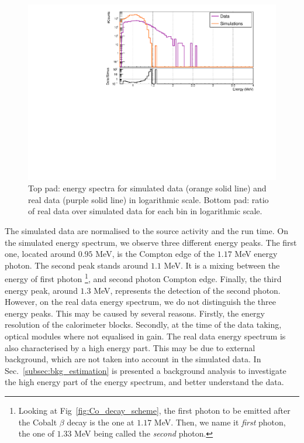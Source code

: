 \begin{figure}[h]
  \centering
  \includegraphics[width=17cm]{commissioning/fig_commissioning/Co_efficiency_detector.pdf}
  \caption{Top pad: energy spectra for simulated data (orange solid line) and real data (purple solid line) in logarithmic scale.
    Bottom pad: ratio of real data over simulated data for each bin in logarithmic scale.
\label{fig:detector_efficiency}}
\end{figure}
The simulated data are normalised to the source activity and the run time.
On the simulated energy spectrum, we observe three different energy peaks.
The first one, located around $0.95$ MeV, is the Compton edge of the $1.17$ MeV energy photon.
The second peak stands around $1.1$ MeV. It is a mixing between the energy of first photon
\footnote{Looking at Fig~\ref{fig:Co_decay_scheme}, the first photon to be emitted after the Cobalt $\beta$ decay is the one at $1.17$ MeV.
  Then, we name it \emph{first} photon, the one of $1.33$ MeV being called the \emph{second} photon.}, and second photon Compton edge.
Finally, the third energy peak, around $1.3$ MeV, represents the detection of the second photon.
However, on the real data energy spectrum, we do not distinguish the three energy peaks.
This may be caused by several reasons.
Firstly, the energy resolution of the calorimeter blocks.
Secondly, at the time of the data taking, optical modules where not equalised in gain.
The real data energy spectrum is also characterised by a high energy part.
This may be due to external background, which are not taken into account in the simulated data.
In Sec.~\ref{subsec:bkg_estimation} is presented a background analysis to investigate the high energy part of the energy spectrum, and better understand the data.

